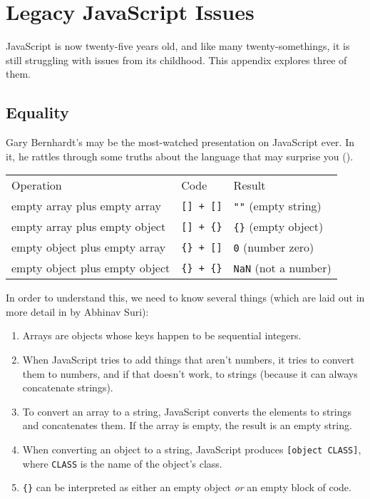 \chapter{Legacy JavaScript Issues}\label{s:legacy}

JavaScript is now twenty-five years old,
and like many twenty-somethings,
it is still struggling with issues from its childhood.
This appendix explores three of them.

\section{Equality}\label{s:legacy-equality}

Gary Bernhardt's 
may be the most-watched presentation on JavaScript ever.
In it,
he rattles through some truths about the language that may surprise you
().

\begin{table}
\begin{longtable}{lll}
Operation & Code & Result \\
empty array plus empty array & \texttt{[]\ +\ []} & \texttt{""} (empty string) \\
empty array plus empty object & \texttt{[]\ +\ \{\}} & \texttt{\{\}} (empty object) \\
empty object plus empty array & \texttt{\{\}\ +\ []} & \texttt{0} (number zero) \\
empty object plus empty object & \texttt{\{\}\ +\ \{\}} & \texttt{NaN} (not a number) \\
\end{longtable}
\end{table}

In order to understand this, we need to know several things
(which are laid out in more detail in  by Abhinav Suri):

\begin{enumerate}
\item
  Arrays are objects whose keys happen to be sequential integers.
\item
  When JavaScript tries to add things that aren't numbers,
  it tries to convert them to numbers,
  and if that doesn't work,
  to strings (because it can always concatenate strings).
\item
  To convert an array to a string,
  JavaScript converts the elements to strings and concatenates them.
  If the array is empty, the result is an empty string.
\item
  When converting an object to a string,
  JavaScript produces \texttt{[object\ CLASS]},
  where \texttt{CLASS} is the name of the object's class.
\item
  \texttt{\{\}} can be interpreted as either an empty object \emph{or} an empty block of code.
\end{enumerate}

